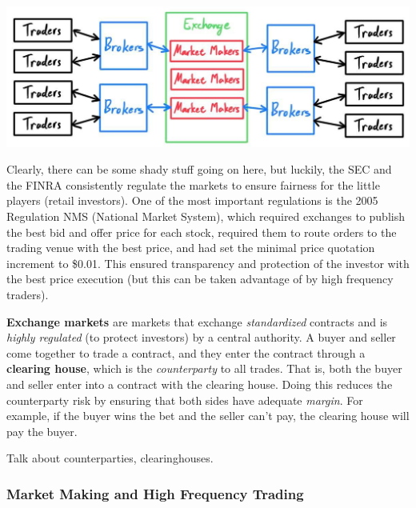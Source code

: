 \documentclass{article}
\begin{document}
    \begin{center}
        \includegraphics[scale=0.3]{img/exchange.jpg}
    \end{center}

    Clearly, there can be some shady stuff going on here, but luckily, the SEC and the FINRA consistently regulate the markets to ensure fairness for the little players (retail investors). One of the most important regulations is the 2005 Regulation NMS (National Market System), which required exchanges to publish the best bid and offer price for each stock, required them to route orders to the trading venue with the best price, and had set the minimal price quotation increment to \$0.01. This ensured transparency and protection of the investor with the best price execution (but this can be taken advantage of by high frequency traders). 

    \begin{definition}
      \textbf{Exchange markets} are markets that exchange \textit{standardized} contracts and is \textit{highly regulated} (to protect investors) by a central authority. A buyer and seller come together to trade a contract, and they enter the contract through a \textbf{clearing house}, which is the \textit{counterparty} to all trades. That is, both the buyer and seller enter into a contract with the clearing house. Doing this reduces the counterparty risk by ensuring that both sides have adequate \textit{margin}. For example, if the buyer wins the bet and the seller can't pay, the clearing house will pay the buyer.
    \end{definition}

    \begin{question}
      Talk about counterparties, clearinghouses. 
    \end{question}

    \subsubsection{Market Making and High Frequency Trading}
\end{document}
